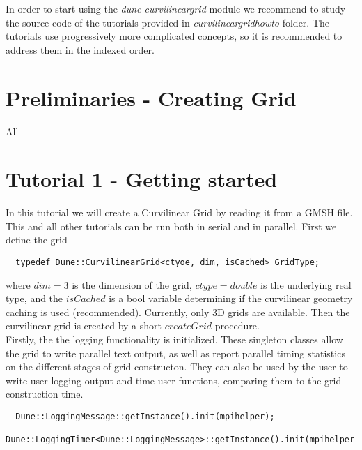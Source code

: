 \noindent
In order to start using the \textit{dune-curvilineargrid} module we recommend to study the source code of the tutorials provided in \textit{curvilineargridhowto} folder. The tutorials use progressively more complicated concepts, so it is recommended to address them in the indexed order.


\section{Preliminaries - Creating Grid}
\label{usage-howto-tutorial-preliminaries}

All 



\section{Tutorial 1 - Getting started}
\label{usage-howto-tutorial-gettingstarted}

\noindent
In this tutorial we will create a Curvilinear Grid by reading it from a GMSH file. This and all other tutorials can be run both in serial and in parallel. First we define the grid \\

\begin{mybox}
\begin{lstlisting}
  typedef Dune::CurvilinearGrid<ctyoe, dim, isCached> GridType;
\end{lstlisting}
\end{mybox}

\noindent
where $dim=3$ is the dimension of the grid, $ctype=double$ is the underlying real type, and the $isCached$ is a bool variable determining if the curvilinear geometry caching is used (recommended). Currently, only 3D grids are available. Then the curvilinear grid is created by a short $createGrid$ procedure.  \\

\noindent
Firstly, the the logging functionality is initialized. These singleton classes allow the grid to write parallel text output, as well as report parallel timing statistics on the different stages of grid constructon. They can also be used by the user to write user logging output and time user functions, comparing them to the grid construction time. \\

\begin{mybox}
\begin{lstlisting}
  Dune::LoggingMessage::getInstance().init(mpihelper);
  Dune::LoggingTimer<Dune::LoggingMessage>::getInstance().init(mpihelper);
\end{lstlisting}
\end{mybox}

